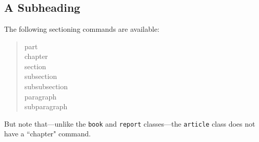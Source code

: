 \documentclass[11pt, openany]{book}              %
\begin{document}
\chapter{}
 
\section{A Subheading}                  %
The following sectioning commands are available:
\begin{quote}                           %
 part \\                                %
 chapter \\                             %
 section \\ 
 subsection \\ 
 subsubsection \\ 
 paragraph \\ 
 subparagraph 
\end{quote}                             %
But note that---unlike the \texttt{book} and \texttt{report} classes---the
\texttt{article} class does not have a ``chapter" command.
 
\end{document}

